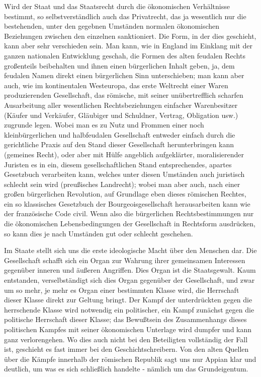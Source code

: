 Wird der Staat und das Staatsrecht durch die ökonomischen
Verhältnisse bestimmt, so selbstverständlich auch das Privatrecht, das
ja wesentlich nur die bestehenden, unter den gegebnen Umständen normalen
ökonomischen Beziehungen zwischen den einzelnen sanktioniert. Die Form,
in der dies geschieht, kann aber sehr verschieden sein. Man kann, wie in
England im Einklang mit der ganzen nationalen Entwicklung geschah, die
Formen des alten feudalen Rechts großenteils beibehalten und ihnen einen
bürgerlichen Inhalt geben, ja, dem feudalen Namen direkt einen
bürgerlichen Sinn unterschieben; man kann aber auch, wie im
kontinentalen Westeuropa, das erste Weltrecht einer Waren produzierenden
Gesellschaft, das römische, mit seiner unübertrefflich scharfen
Ausarbeitung aller wesentlichen Rechtsbeziehungen einfacher
Warenbesitzer (Käufer und Verkäufer, Gläubiger und Schuldner, Vertrag,
Obligation usw.) zugrunde legen. Wobei man es zu Nutz und Frommen einer
noch kleinbürgerlichen und halbfeudalen Gesellschaft entweder einfach
durch die gerichtliche Praxis auf den Stand dieser Gesellschaft
herunterbringen kann (gemeines Recht), oder aber mit Hülfe angeblich
aufgeklärter, moralisierender Juristen es in ein, diesem
gesellschaftlichen Stand entsprechendes, apartes Gesetzbuch verarbeiten
kann, welches unter diesen Umständen auch juristisch schlecht sein wird
(preußisches Landrecht); wobei man aber auch, nach einer großen
bürgerlichen Revolution, auf Grundlage eben dieses römischen Rechtes,
ein so klassisches Gesetzbuch
der Bourgeoisgesellschaft herausarbeiten kann wie der französische Code
civil. Wenn also die bürgerlichen Rechtsbestimmungen nur die
ökonomischen Lebensbedingungen der Gesellschaft in Rechtsform
ausdrücken, so kann dies je nach Umständen gut oder schlecht geschehen.

Im Staate stellt sich uns die erste ideologische Macht über den
Menschen dar. Die Gesellschaft schafft sich ein Organ zur Wahrung ihrer
gemeinsamen Interessen gegenüber inneren und äußeren Angriffen. Dies
Organ ist die Staatsgewalt. Kaum entstanden, verselbständigt sich dies
Organ gegenüber der Gesellschaft, und zwar um so mehr, je mehr es Organ
einer bestimmten Klasse wird, die Herrschaft dieser Klasse direkt zur
Geltung bringt. Der Kampf der unterdrückten gegen die herrschende Klasse
wird notwendig ein politischer, ein Kampf zunächst gegen die politische
Herrschaft dieser Klasse; das Bewußtsein des Zusammenhangs dieses
politischen Kampfes mit seiner ökonomischen Unterlage wird dumpfer und
kann ganz verlorengehen. Wo dies auch nicht bei den Beteiligten
vollständig der Fall ist, geschieht es fast immer bei den
Geschichtschreibern. Von den alten Quellen über die Kämpfe innerhalb der
römischen Republik sagt uns nur Appian klar und deutlich, um was es sich
schließlich handelte - nämlich um das Grundeigentum.


